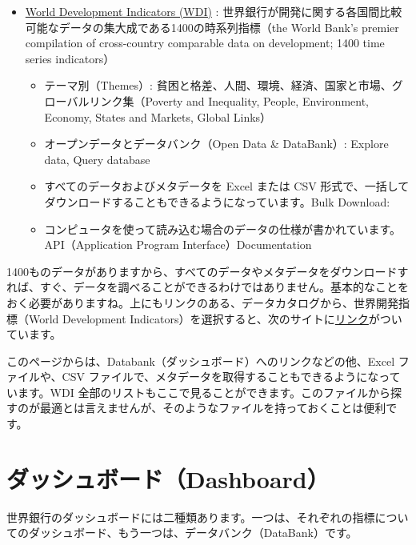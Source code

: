 \documentclass[
  xelatex, ja=standard]{bxjsbook}
\providecommand{\tightlist}{%
  \setlength{\itemsep}{0pt}\setlength{\parskip}{0pt}}
\theoremstyle{definition}
\theoremstyle{definition}
\theoremstyle{definition}
\theoremstyle{definition}
\theoremstyle{remark}
\begin{document}
\begin{itemize}
\tightlist
\item
  \href{https://datatopics.worldbank.org/world-development-indicators/}{World Development Indicators (WDI)} : 世界銀行が開発に関する各国間比較可能なデータの集大成である1400の時系列指標（the World Bank's premier compilation of cross-country comparable data on development; 1400 time series indicators）

  \begin{itemize}
  \tightlist
  \item
    テーマ別（Themes）: 貧困と格差、人間、環境、経済、国家と市場、グローバルリンク集（Poverty and Inequality, People, Environment, Economy, States and Markets, Global Links）
  \item
    オープンデータとデータバンク（Open Data \& DataBank）: Explore data, Query database
  \item
    すべてのデータおよびメタデータを Excel または CSV 形式で、一括してダウンロードすることもできるようになっています。Bulk Download:
  \item
    コンピュータを使って読み込む場合のデータの仕様が書かれています。API（Application Program Interface）Documentation
  \end{itemize}
\end{itemize}

1400ものデータがありますから、すべてのデータやメタデータをダウンロードすれば、すぐ、データを調べることができるわけではありません。基本的なことをおく必要がありますね。上にもリンクのある、データカタログから、世界開発指標（World Development Indicators）を選択すると、次のサイトに\href{https://datacatalog.worldbank.org/search/dataset/0037712/World-Development-Indicators}{リンク}がついています。

このページからは、Databank（ダッシュボード）へのリンクなどの他、Excel ファイルや、CSV ファイルで、メタデータを取得することもできるようになっています。WDI 全部のリストもここで見ることができます。このファイルから探すのが最適とは言えませんが、そのようなファイルを持っておくことは便利です。

\hypertarget{ux30c0ux30c3ux30b7ux30e5ux30dcux30fcux30c9dashboard}{%
\section{ダッシュボード（Dashboard）}\label{ux30c0ux30c3ux30b7ux30e5ux30dcux30fcux30c9dashboard}}

世界銀行のダッシュボードには二種類あります。一つは、それぞれの指標についてのダッシュボード、もう一つは、データバンク（DataBank）です。
\end{document}
